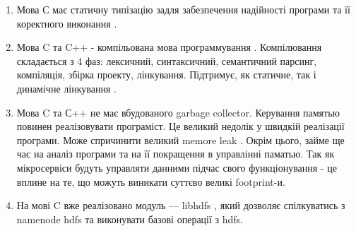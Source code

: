     \begin{enumerate}
        \item Мова С має статичну типізацію задля забезпечення надійності програми та її коректного виконання \cite{clang2005intro,clang2005dynamic}.
        \item Мова C та C++ - компільована мова программування \cite{compile2014c}.
        Компілювання складається з 4 фаз: лексичний, синтаксичний, семантичний парсинг, компіляція, збірка проекту, лінкування.
        Підтримує, як статичне, так і динамічне лінкування \cite{linking2018clang,linking2019briefly}.
        \item Мова C та С++ не має вбудованого garbage collector. Керування памятью повинен реалізовувати програміст.
        Це великий недолік у швидкій реалізації програми. Може спричинити великий memore leak \cite{clang2005memory}.
        Окрім цього, займе ще час на аналіз програми та на її покращення в управлінні паматью. 
        Так як мікросервіси будуть управляти данними підчас свого функціонування - це вплине на те, що можуть виникати
        суттєво великі footprint-и.
        \item На мові C вже реалізовано модуль --- libhdfs \cite{libhdfs2018}, який дозволяє спілкуватись з namenode hdfs та виконувати базові операції з hdfs.
    \end{enumerate}


